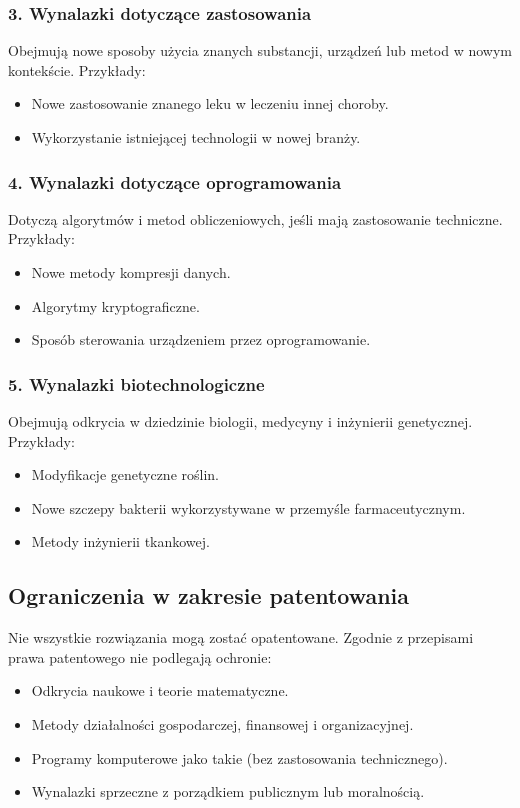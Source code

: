 \subsubsection{3. Wynalazki dotyczące zastosowania}
Obejmują nowe sposoby użycia znanych substancji, urządzeń lub metod w nowym kontekście. Przykłady:
\begin{itemize}
    \item Nowe zastosowanie znanego leku w leczeniu innej choroby.
    \item Wykorzystanie istniejącej technologii w nowej branży.
\end{itemize}

\subsubsection{4. Wynalazki dotyczące oprogramowania}
Dotyczą algorytmów i metod obliczeniowych, jeśli mają zastosowanie techniczne. Przykłady:
\begin{itemize}
    \item Nowe metody kompresji danych.
    \item Algorytmy kryptograficzne.
    \item Sposób sterowania urządzeniem przez oprogramowanie.
\end{itemize}

\subsubsection{5. Wynalazki biotechnologiczne}
Obejmują odkrycia w dziedzinie biologii, medycyny i inżynierii genetycznej. Przykłady:
\begin{itemize}
    \item Modyfikacje genetyczne roślin.
    \item Nowe szczepy bakterii wykorzystywane w przemyśle farmaceutycznym.
    \item Metody inżynierii tkankowej.
\end{itemize}

\subsection{Ograniczenia w zakresie patentowania}
Nie wszystkie rozwiązania mogą zostać opatentowane. Zgodnie z przepisami prawa patentowego nie podlegają ochronie:
\begin{itemize}
    \item Odkrycia naukowe i teorie matematyczne.
    \item Metody działalności gospodarczej, finansowej i organizacyjnej.
    \item Programy komputerowe jako takie (bez zastosowania technicznego).
    \item Wynalazki sprzeczne z porządkiem publicznym lub moralnością.
\end{itemize}

